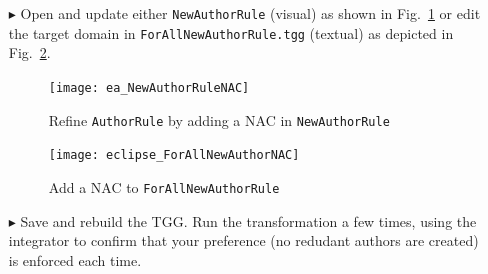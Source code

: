 \begin{itemize}

\item[$\blacktriangleright$] Open and update either \texttt{NewAuthorRule} (visual) as shown in Fig.~\ref{ea:existingAuthorNAC} or edit the target domain in 
\texttt{ForAllNewAuthorRule.tgg} (textual) as depicted in Fig.~\ref{eclipse:existingAuthorNAC}.


\begin{figure}[htbp]
\begin{center}
  \texttt{[image: ea\_NewAuthorRuleNAC]}
  \caption{Refine \texttt{AuthorRule} by adding a NAC in \texttt{NewAuthorRule} \update}
  \label{ea:existingAuthorNAC}
\end{center}
\end{figure}

\begin{figure}[htbp]
\begin{center}
  \texttt{[image: eclipse\_ForAllNewAuthorNAC]}
  \caption{Add a NAC to \texttt{ForAllNewAuthorRule}}
  \label{eclipse:existingAuthorNAC}
\end{center}
\end{figure}

\item[$\blacktriangleright$] Save and rebuild the TGG. Run the transformation a few times, using the integrator to confirm that your preference (no redudant
authors are created) is enforced each time. 

\end{itemize}

